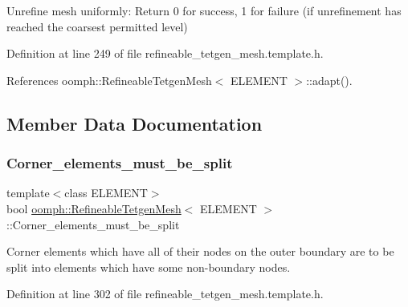 Unrefine mesh uniformly\+: Return 0 for success, 1 for failure (if unrefinement has reached the coarsest permitted level) 



Definition at line 249 of file refineable\+\_\+tetgen\+\_\+mesh.\+template.\+h.



References oomph\+::\+Refineable\+Tetgen\+Mesh$<$ E\+L\+E\+M\+E\+N\+T $>$\+::adapt().



\subsection{Member Data Documentation}
\mbox{\label{classoomph_1_1RefineableTetgenMesh_a72b505d4bfd018471ef1543e18ae5fce}} 
\subsubsection{\texorpdfstring{Corner\+\_\+elements\+\_\+must\+\_\+be\+\_\+split}{Corner\_elements\_must\_be\_split}}
{\footnotesize\ttfamily template$<$class E\+L\+E\+M\+E\+NT$>$ \\
bool \hyperlink{classoomph_1_1RefineableTetgenMesh}{oomph\+::\+Refineable\+Tetgen\+Mesh}$<$ E\+L\+E\+M\+E\+NT $>$\+::Corner\+\_\+elements\+\_\+must\+\_\+be\+\_\+split\hspace{0.3cm}{\ttfamily [protected]}}



Corner elements which have all of their nodes on the outer boundary are to be split into elements which have some non-\/boundary nodes. 



Definition at line 302 of file refineable\+\_\+tetgen\+\_\+mesh.\+template.\+h.

\mbox{\label{classoomph_1_1RefineableTetgenMesh_a274ebedf983f3b34620fa2bbb1980fcd}} 
